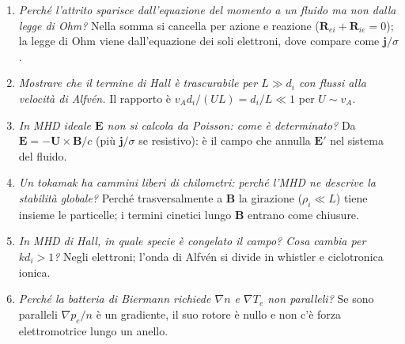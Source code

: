 \begin{enumerate}
\item \textit{Perché l'attrito sparisce dall'equazione del momento a un fluido ma non dalla legge di Ohm?} Nella somma si cancella per azione e reazione ($\mathbf{R}_{ei}+\mathbf{R}_{ie}=0$); la legge di Ohm viene dall'equazione dei soli elettroni, dove compare come $\mathbf{j}/\sigma$.
\item \textit{Mostrare che il termine di Hall è trascurabile per $L\gg d_i$ con flussi alla velocità di Alfv\'en.} Il rapporto è $v_Ad_i/(UL)=d_i/L\ll1$ per $U\sim v_A$.
\item \textit{In MHD ideale $\mathbf{E}$ non si calcola da Poisson: come è determinato?} Da $\mathbf{E}=-\mathbf{U}\times\mathbf{B}/c$ (più $\mathbf{j}/\sigma$ se resistivo): è il campo che annulla $\mathbf{E}'$ nel sistema del fluido.
\item \textit{Un tokamak ha cammini liberi di chilometri: perché l'MHD ne descrive la stabilità globale?} Perché trasversalmente a $\mathbf{B}$ la girazione ($\rho_i\ll L$) tiene insieme le particelle; i termini cinetici lungo $\mathbf{B}$ entrano come chiusure.
\item \textit{In MHD di Hall, in quale specie è congelato il campo? Cosa cambia per $kd_i>1$?} Negli elettroni; l'onda di Alfv\'en si divide in whistler e ciclotronica ionica.
\item \textit{Perché la batteria di Biermann richiede $\nabla n$ e $\nabla T_e$ non paralleli?} Se sono paralleli $\nabla p_e/n$ è un gradiente, il suo rotore è nullo e non c'è forza elettromotrice lungo un anello.
\end{enumerate}


